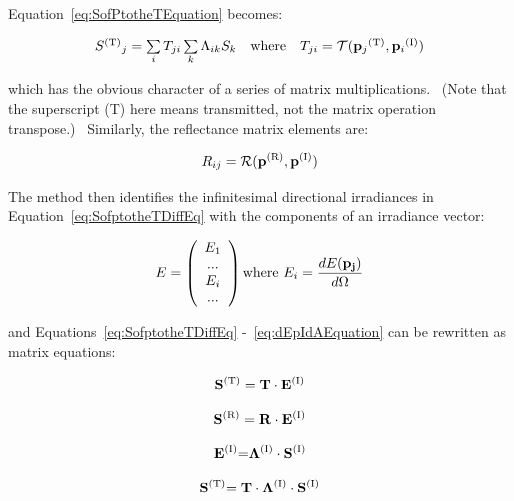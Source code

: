 Equation~\ref{eq:SofPtotheTEquation} becomes:

\begin{equation}
\begin{array}{*{20}{c}}{{S^{{\rm{(T)}}}}_j = \sum\limits_i {{T_{ji}}} \sum\limits_k {{\Lambda_{ik}}} {S_k}}&{{\rm{where}}}&{{T_{ji}} = {\mathcal{T}} ({{\bf{p}}_j}^{{\rm{(T)}}},{{\bf{p}}_i}^{{\rm{(I)}}})}\end{array}
\end{equation}

which has the obvious character of a series of matrix multiplications.~ (Note that the superscript (T) here means transmitted, not the matrix operation transpose.)~ Similarly, the reflectance matrix elements are:

\begin{equation}
{R_{ij}} = {\mathcal{R}} ({{\bf{p}}^{{\rm{(R)}}}},{{\bf{p}}^{{\rm{(I)}}}})
\label{eq:RijEquation}
\end{equation}

The method then identifies the infinitesimal directional irradiances in Equation~\ref{eq:SofptotheTDiffEq} with the components of an irradiance vector:

\begin{equation}
E = \left( 
    \begin{array}{c}
      E_1 \\ ... \\ E_i \\ ...
    \end{array}
  \right)
  \text{where}
  ~E_i = \frac{dE(\bf{p}_j)}{d\Omega}
\end{equation}

and Equations~\ref{eq:SofptotheTDiffEq} -~\ref{eq:dEpIdAEquation} can be rewritten as matrix equations:

\begin{equation}
{{\bf{S}}^{{\rm{(T)}}}} = {\bf{T}} \cdot {{\bf{E}}^{{\rm{(I)}}}}
\end{equation}

\begin{equation}
{{\bf{S}}^{{\rm{(R)}}}} = {\bf{R}} \cdot {{\bf{E}}^{{\rm{(I)}}}}
\end{equation}

\begin{equation}
{{\bf{E}}^{{\rm{(I)}}}}{\bf{ = }}{\bf{\Lambda }^{{\rm{(I)}}}} \cdot {{\bf{S}}^{{\rm{(I)}}}}
\end{equation}

\begin{equation}
{{\bf{S}}^{{\rm{(T)}}}}{\bf{ = T}} \cdot {\bf{\Lambda }^{{\rm{(I)}}}} \cdot {{\bf{S}}^{{\rm{(I)}}}}
\end{equation}


